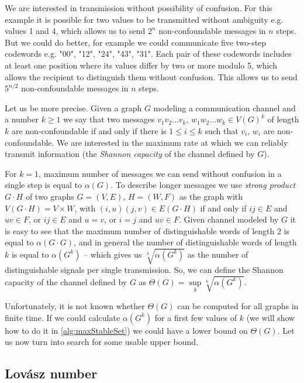 We are interested in transmission without possibility of confusion. For this example it is possible for two values to be transmitted without ambiguity e.g. values 1 and 4, which allows us to send $2^n$ non-confoundable messages in $n$ steps. But we could do better, for example we could communicate five two-step codewords e.g. "00", "12", "24", "43", "31". Each pair of these codewords includes at least one position where its values differ by two or more modulo 5, which allows the recipient to distinguish them without confusion.  This allows us to send $5^{n / 2}$ non-confoundable messages in $n$ steps.

Let us be more precise. Given a graph $G$ modeling a communication channel and a number $k \geq 1$ we say that two messages $v_1v_2\ldots v_k$, $w_1w_2\ldots w_k \in V(G)^k$ of length $k$ are non-confoundable if and only if there is $1 \leq i \leq k$ such that $v_i$, $w_i$ are non-confoundable. We are interested in the maximum rate at which we can reliably transmit information (the \emph{Shannon capacity} of the channel defined by $G$).

For $k = 1$, maximum number of messages we can send without confusion in a single step is equal to $\alpha(G)$. To describe longer messages we use \emph{strong product} $G \cdot H$ of two graphs $G = (V, E)$, $H = (W, F)$ as the graph with $V(G \cdot H) = V \times W$, with $(i, u)(j, v) \in E(G \cdot H)$ if and only if $ij \in E$ and $uv \in F$, or $ij \in E$ and $u = v$, or $i = j$ and $uv \in F$. Given channel modeled by $G$ it is easy to see that the maximum number of distinguishable words of length 2 is equal to $\alpha(G \cdot G)$, and in general the number of distinguishable words of length $k$ is equal to $\alpha(G^k)$ -- which gives us $\sqrt[k]{\alpha(G^k)}$ as the number of distinguishable signals per single transmission. So, we can define the Shannon capacity of the channel defined by $G$ as $\Theta(G) = \sup\limits_k \sqrt[k]{\alpha(G^k)}$.

Unfortunately, it is not known whether $\Theta(G)$ can be computed for all graphs in finite time. If we could calculate $\alpha(G^k)$ for a first few values of $k$ (we will show how to do it in \cref{alg:maxStableSet}) we could have a lower bound on $\Theta(G)$. Let us now turn into search for some usable upper bound.

\subsection{Lovász number}


